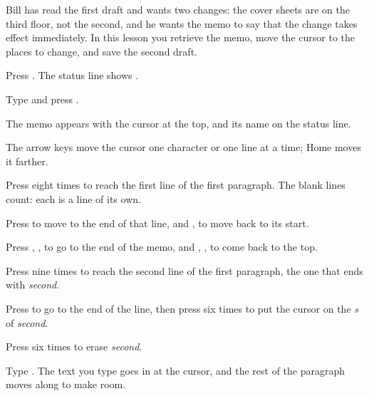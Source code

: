 Bill has read the first draft and wants two changes: the cover sheets are
on the third floor, not the second, and he wants the memo to say that the
change takes effect immediately.  In this lesson you retrieve the memo,
move the cursor to the places to change, and save the second draft.

\begin{WPSteps}
\item Press .  The status line shows
.
\item Type  and press .
\end{WPSteps}
The memo appears with the cursor at the top, and its name on the status
line.

The arrow keys move the cursor one character or one line at a time; Home
moves it farther.
\begin{WPSteps}
\item Press  eight times to reach the first line of the
first paragraph.  The blank lines count: each is a line of its
own.
\item Press  to move to the end of that line, and
,  to move back to its start.
\item Press , ,  to go to the end
of the memo, and , ,  to come back
to the top.
\end{WPSteps}

\begin{WPSteps}
\item Press  nine times to reach the second line of the
first paragraph, the one that ends with \textit{second}.
\item Press  to go to the end of the line, then press
 six times to put the cursor on the \textit{s} of
\textit{second}.
\item Press  six times to erase \textit{second}.
\item Type .  The text you type goes in at the cursor, and the
rest of the paragraph moves along to make room.
\end{WPSteps}


